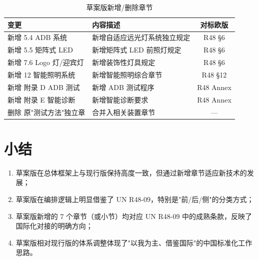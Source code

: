 \begin{table}[H]
\centering
\caption{草案版新增/删除章节}
\small
\begin{tabularx}{\textwidth}{|l|X|c|}
\hline
\textbf{变更} & \textbf{内容描述} & \textbf{对标欧版} \\
\hline
新增 5.4 ADB 系统       & 新增自适应远光灯系统独立规定      & R48 §6 \\
\hline
新增 5.5 矩阵式 LED      & 新增矩阵式 LED 前照灯规定        & R48 §6 \\
\hline
新增 7.6 Logo 灯/迎宾灯   & 新增装饰性灯具规定              & R48 §6 \\
\hline
新增 12 智能照明系统     & 新增智能照明综合章节            & R48 §12 \\
\hline
新增 附录 D ADB 测试     & 新增 ADB 测试程序              & R48 Annex \\
\hline
新增 附录 E 智能诊断     & 新增智能诊断要求                & R48 Annex \\
\hline
删除 原"测试方法"独立章  & 合并入相关装置章节            & --- \\
\hline
\end{tabularx}
\end{table}

\section{小结}

\begin{enumerate}[leftmargin=2em]
    \item 草案版在总体框架上与现行版保持高度一致，但通过新增章节适应新技术的发展；
    \item 草案版在编排逻辑上明显借鉴了 UN R48-09，特别是"前/后/侧"的分类方式；
    \item 草案版新增的 7 个章节（或小节）均对应 UN R48-09 中的成熟条款，反映了国际化对接的明确方向；
    \item 草案版相对现行版的体系调整体现了"以我为主、借鉴国际"的中国标准化工作思路。
\end{enumerate}